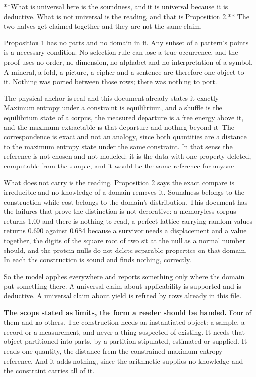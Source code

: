 **What is universal here is the soundness, and it is universal because it is deductive. What is not universal is the reading, and that is Proposition 2.** The two halves get claimed together and they are not the same claim.

Proposition 1 has no parts and no domain in it. Any subset of a pattern's points is a necessary condition. No selection rule can lose a true occurrence, and the proof uses no order, no dimension, no alphabet and no interpretation of a symbol. A mineral, a fold, a picture, a cipher and a sentence are therefore one object to it. Nothing was ported between those rows; there was nothing to port.

The physical anchor is real and this document already states it exactly. Maximum entropy under a constraint is equilibrium, and a shuffle is the equilibrium state of a corpus, the measured departure is a free energy above it, and the maximum extractable is that departure and nothing beyond it. The correspondence is exact and not an analogy, since both quantities are a distance to the maximum entropy state under the same constraint. In that sense the reference is not chosen and not modeled: it is the data with one property deleted, computable from the sample, and it would be the same reference for anyone.

What does not carry is the reading. Proposition 2 says the exact compare is irreducible and no knowledge of a domain removes it. Soundness belongs to the construction while cost belongs to the domain's distribution. This document has the failures that prove the distinction is not decorative: a memoryless corpus returns 1.00 and there is nothing to read, a perfect lattice carrying random values returns 0.690 against 0.684 because a survivor needs a displacement and a value together, the digits of the square root of two sit at the null as a normal number should, and the protein nulls do not delete separable properties on that domain. In each the construction is sound and finds nothing, correctly.

So the model applies everywhere and reports something only where the domain put something there. A universal claim about applicability is supported and is deductive. A universal claim about yield is refuted by rows already in this file.

\textbf{The scope stated as limits, the form a reader should be handed.} Four of them and no others. The construction needs an instantiated object: a sample, a record or a measurement, and never a thing suspected of existing. It needs that object partitioned into parts, by a partition stipulated, estimated or supplied. It reads one quantity, the distance from the constrained maximum entropy reference. And it adds nothing, since the arithmetic supplies no knowledge and the constraint carries all of it.

